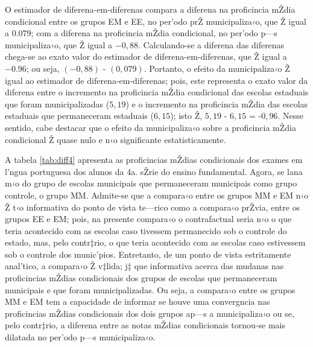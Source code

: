 \documentclass[a4paper, 12pt]{article}
\begin{document}
O estimador de diferena-em-diferenas compara a diferena na proficincia mŽdia condicional entre os grupos EM e EE, no per’odo prŽ municipaliza‹o, que Ž igual a $0.079$; com a diferena na proficincia mŽdia condicional, no per’odo p—s municipaliza‹o, que Ž igual a $-0,88$. Calculando-se a diferena das diferenas chega-se ao exato valor do estimador de diferena-em-diferenas, que Ž igual a $-0.96$; ou seja,  $(-0,88)$ - $(0,079)$. Portanto, o efeito da municipaliza‹o Ž igual ao estimador de diferena-em-diferenas; pois, este representa o exato valor da diferena entre o incremento na proficincia mŽdia condicional das escolas estaduais que foram municipalizadas ($5,19$) e o incremento na proficincia mŽdia das escolas estaduais que permaneceram estaduais ($6,15$); isto Ž, $5,19$ - $6,15$ =  -$0,96$. Nesse sentido, cabe destacar que o efeito da municipaliza‹o sobre a proficincia mŽdia condicional Ž quase nulo e n‹o significante estatisticamente. 




                             

A tabela \ref{tab:diff4} apresenta as proficincias mŽdias condicionais dos exames em l’ngua portuguesa dos alunos da 4a. sŽrie do ensino fundamental. Agora, se lana m‹o do grupo de escolas municipais que permaneceram municipais como grupo controle, o grupo MM. Admite-se que a compara‹o entre os grupos MM e EM n‹o Ž t‹o informativa do ponto de vista te—rico como a compara‹o prŽvia, entre os grupos EE e EM; pois, na presente compara‹o o contrafactual seria n‹o o que teria acontecido com as escolas caso tivessem permanecido sob o controle do estado, mas, pelo contr‡rio, o que teria acontecido com as escolas caso estivessem sob o controle dos munic’pios. Entretanto, de um ponto de vista estritamente anal’tico, a compara‹o Ž v‡lida; j‡ que informativa acerca das mudanas nas proficincias mŽdias condicionais dos grupos de escolas que permaneceram municipais e que foram municipalizadas. Ou seja, a compara‹o entre os grupos MM e EM tem a capacidade de informar se houve uma convergncia nas proficincias mŽdias condicionais dos dois grupos ap—s a municipaliza‹o ou se, pelo contr‡rio, a diferena entre as notas mŽdias condicionais tornou-se mais dilatada no per’odo p—s municipaliza‹o.
\end{document}
